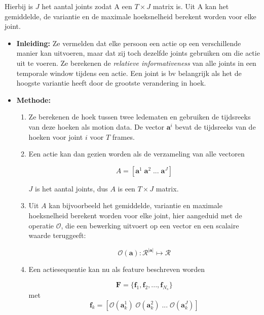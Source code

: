 Hierbij is $J$ het aantal joints zodat A een $T \times J$ matrix is. Uit A kan het gemiddelde, de variantie en de maximale hoeksnelheid berekent worden voor elke joint. 
	\begin{itemize}
	\item \textbf{Inleiding:} Ze vermelden dat elke persoon een actie op een verschillende manier kan uitvoeren, maar dat zij toch dezelfde joints gebruiken om die actie uit te voeren. Ze berekenen de \textit{relatieve informativeness} van alle joints in een temporale window tijdens een actie. Een joint is bv belangrijk als het de hoogste variantie heeft door de grootste verandering in hoek.
	\item \textbf{Methode:} 
	\begin{enumerate}
		\item Ze berekenen de hoek tussen twee ledematen en gebruiken de tijdsreeks van deze hoeken als motion data. De vector $\textbf{a}^i$ bevat de tijdsreeks van de hoeken voor joint $i$ voor $T$ frames.
		\item Een actie kan dan gezien worden als de verzameling van alle vectoren
		
		$$A = [\textbf{a}^1\; \textbf{a}^2\; ...\; \textbf{a}^J]$$
		
		$J$ is het aantal joints,	dus $A$ is een $T \times J$ matrix.
		
		\item Uit $A$ kan bijvoorbeeld het gemiddelde, variantie en maximale hoeksnelheid berekent worden voor elke joint, hier aangeduid met de operatie $\mathcal{O}$, die een bewerking uitvoert op een vector en een scalaire waarde teruggeeft:
		
		$$\mathcal{O}(\textbf{a}) : \mathcal{R}^{|\textbf{a}|} \mapsto \mathcal{R}$$
		
		\item Een actiesequentie kan nu als feature beschreven worden
		
		$$\textbf{F} = \{\textbf{f}_1, \textbf{f}_2, ..., \textbf{f}_{N_{s}}\}$$
		met
		$$\textbf{f}_k = [\mathcal{O}(\textbf{a}_k^1)\; \mathcal{O}(\textbf{a}_k^2) \; ... \; \mathcal{O}(\textbf{a}_k^J)]$$
		

\end{enumerate}
\end{itemize}
